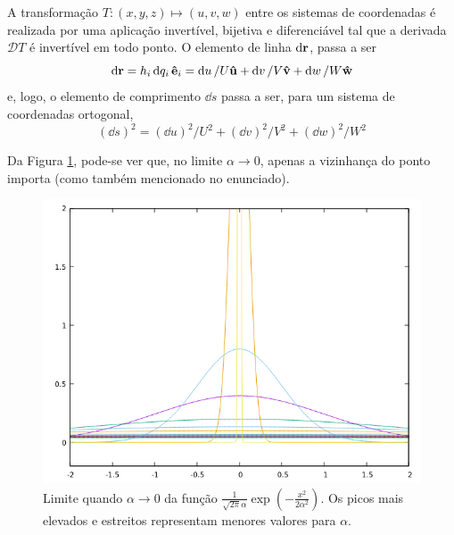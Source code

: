 A transformação  $T \colon (x,y,z) \mapsto (u,v,w)$ entre os sistemas de coordenadas é realizada por uma aplicação invertível, bijetiva e diferenciável tal que a derivada $\mathcal{D}T$ é invertível em todo ponto.
O elemento de linha $\dd{\vb{r}}$, passa a ser
\[
  \dd{\vb{r}} = h_i \dd{q_i} \vu{e}_i = \dd{u}/U \vu{u} + \dd{v}/V \vu{v} +\dd{w}/W \vu{w}
\]
e, logo, o elemento de comprimento $\dd{s}$ passa a ser, para um sistema de coordenadas ortogonal,
\[
  (\dd{s})^2 = (\dd{u})^2/U^2 + (\dd{v})^2/V^2 + (\dd{w})^2/W^2
\]
%
%
%


Da Figura \ref{fig:gaussian-limit}, pode-se ver que, no limite $\alpha \to 0$, apenas a vizinhança do ponto  importa (como também mencionado no enunciado).
\begin{figure}[h]
  \center
  \includegraphics[scale = .4]{./imgs/gaussian_limit.png}
  \caption{Limite quando $\alpha \to 0$ da função $\frac{1}{\sqrt{2\pi} \alpha} \exp(-\frac{x^2}{2\alpha^2})$. Os picos mais elevados e estreitos representam menores valores para $\alpha$.}
  \label{fig:gaussian-limit}
\end{figure}

